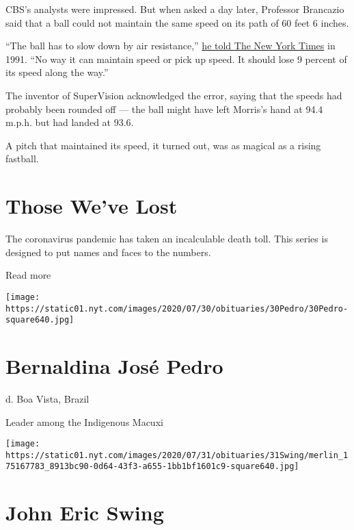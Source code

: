CBS's analysts were impressed. But when asked a day later, Professor
Brancazio said that a ball could not maintain the same speed on its path
of 60 feet 6 inches.

``The ball has to slow down by air resistance,''
\href{https://www.nytimes.com/1991/10/22/sports/tv-sports-the-no-braking-ball-cbs-versus-physics.html}{he
told The New York Times} in 1991. ``No way it can maintain speed or pick
up speed. It should lose 9 percent of its speed along the way.''

The inventor of SuperVision acknowledged the error, saying that the
speeds had probably been rounded off --- the ball might have left
Morris's hand at 94.4 m.p.h. but had landed at 93.6.

A pitch that maintained its speed, it turned out, was as magical as a
rising fastball.

\href{https://www.nytimes.com/interactive/2020/obituaries/people-died-coronavirus-obituaries.html?action=click\&pgtype=Article\&state=default\&region=BELOW_MAIN_CONTENT\&context=covid_obits_promo}{}

\hypertarget{those-weve-lost}{%
\section{Those We've Lost}\label{those-weve-lost}}

The coronavirus pandemic has taken an incalculable death toll. This
series is designed to put names and faces to the numbers.

Read more

\texttt{[image: https://static01.nyt.com/images/2020/07/30/obituaries/30Pedro/30Pedro-square640.jpg]}

\hypertarget{bernaldina-josuxe9-pedro}{%
\section{Bernaldina José Pedro}\label{bernaldina-josuxe9-pedro}}

d. Boa Vista, Brazil

Leader among the Indigenous Macuxi

\texttt{[image: https://static01.nyt.com/images/2020/07/31/obituaries/31Swing/merlin\_175167783\_8913bc90-0d64-43f3-a655-1bb1bf1601c9-square640.jpg]}

\hypertarget{john-eric-swing}{%
\section{John Eric Swing}\label{john-eric-swing}}

